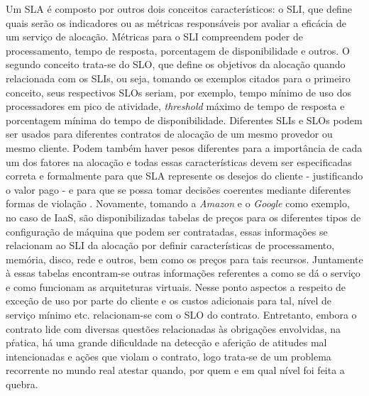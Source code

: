 %
Um \ac{SLA} é composto por outros dois conceitos característicos: o \ac{SLI}, que define quais serão os indicadores ou as métricas responsáveis por avaliar a eficácia de um serviço de alocação. Métricas para o \ac{SLI} compreendem poder de processamento, tempo de resposta, porcentagem de disponibilidade e outros. O segundo conceito trata-se do \ac{SLO}, que define os objetivos da alocação quando relacionada com os \acp{SLI}, ou seja, tomando os exemplos citados para o primeiro conceito, seus respectivos \acp{SLO} seriam, por exemplo, tempo mínimo de uso dos processadores em pico de atividade, \textit{threshold} máximo de tempo de resposta e porcentagem mínima do tempo de disponibilidade. Diferentes \acp{SLI} e \acp{SLO} podem ser usados para diferentes contratos de alocação de um mesmo provedor ou mesmo cliente. Podem também haver pesos diferentes para a importância de cada um dos fatores na alocação e todas essas características devem ser especificadas correta e formalmente para que \ac{SLA} represente os desejos do cliente - justificando o valor pago - e para que se possa tomar decisões coerentes mediante diferentes formas de violação \cite{nuvem_sla:sauve_sli_slo}. Novamente, tomando a \textit{Amazon} \cite{nuvem_sla:precos_amazon} e o \textit{Google} \cite{nuvem_sla:precos_google} como exemplo, no caso de \ac{IaaS}, são disponibilizadas tabelas de preços para os diferentes tipos de configuração de máquina que podem ser contratadas, essas informações se relacionam ao \ac{SLI} da alocação por definir características de processamento, memória, disco, rede e outros, bem como os preços para tais recursos. Juntamente à essas tabelas encontram-se outras informações referentes a como se dá o serviço e como funcionam as arquiteturas virtuais. Nesse ponto aspectos a respeito de exceção de uso por parte do cliente e os custos adicionais para tal, nível de serviço mínimo etc. relacionam-se com o \ac{SLO} do contrato.
%
Entretanto, embora o contrato lide com diversas questões relacionadas às obrigações envolvidas, na pŕatica, há uma grande dificuldade na detecção e aferição de atitudes mal intencionadas e ações que violam o contrato, logo trata-se de um problema recorrente no mundo real atestar quando, por quem e em qual nível foi feita a quebra.

